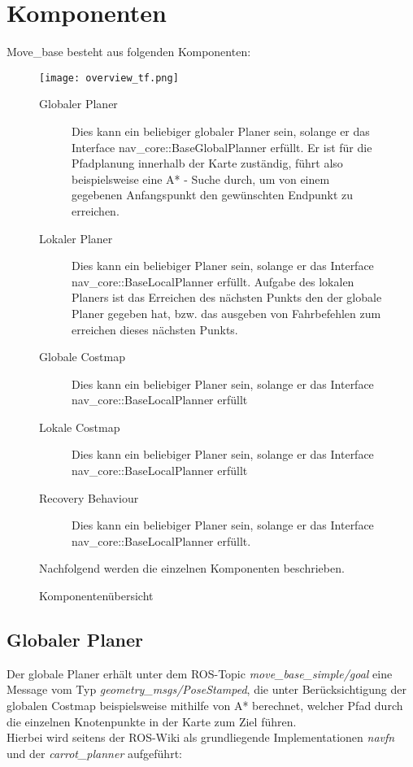 \documentclass[oribibl]{llncs}
\begin{document}
\section{Komponenten}
Move\_base besteht aus folgenden Komponenten: \cite{moveBase}
\begin{figure}
	\centering
  \texttt{[image: overview\_tf.png]}
	\caption{Komponentenübersicht}
	\cite{moveBaseComponenents}
	\label{fig2}
\begin{description}	
\item[Globaler Planer]
Dies kann ein beliebiger globaler Planer sein, solange er das Interface nav\_core::BaseGlobalPlanner erfüllt. Er ist für die Pfadplanung innerhalb der Karte zuständig, führt also beispielsweise eine A* - Suche durch, um von einem gegebenen Anfangspunkt den gewünschten Endpunkt zu erreichen.
\item[Lokaler Planer]
Dies kann ein beliebiger Planer sein, solange er das Interface nav\_core::BaseLocalPlanner erfüllt. Aufgabe des lokalen Planers ist das Erreichen des nächsten Punkts den der globale Planer gegeben hat, bzw. das ausgeben von Fahrbefehlen zum erreichen dieses nächsten Punkts.
\item[Globale Costmap]
Dies kann ein beliebiger Planer sein, solange er das Interface nav\_core::BaseLocalPlanner erfüllt
\item[Lokale Costmap]
Dies kann ein beliebiger Planer sein, solange er das Interface nav\_core::BaseLocalPlanner erfüllt
\item[Recovery Behaviour]
Dies kann ein beliebiger Planer sein, solange er das Interface nav\_core::BaseLocalPlanner erfüllt.

\end{description}

Nachfolgend werden die einzelnen Komponenten beschrieben.
\end{figure}

\subsection{Globaler Planer}
Der globale Planer erhält unter dem ROS-Topic \textit{move\_base\_simple/goal} eine Message vom Typ \textit{geometry\_msgs/PoseStamped}, die unter Berücksichtigung der globalen Costmap beispielsweise mithilfe von A* berechnet, welcher Pfad durch die einzelnen Knotenpunkte in der Karte zum Ziel führen.\\
Hierbei wird seitens der ROS-Wiki als grundliegende Implementationen \textit{navfn} und der \textit{carrot\_planner} aufgeführt:
\end{document}
